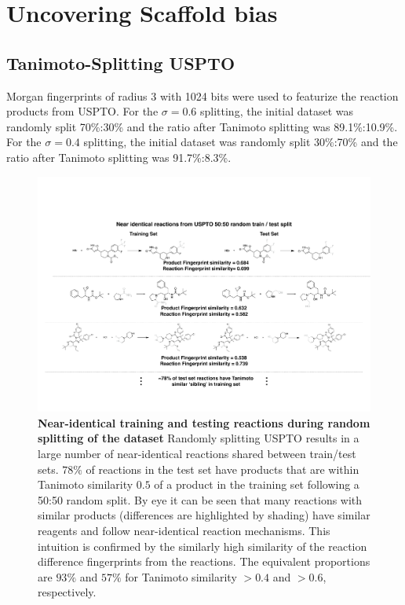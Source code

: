 \section{Uncovering Scaffold bias}

\subsection{Tanimoto-Splitting USPTO}
Morgan fingerprints of radius 3 with 1024 bits were used to featurize the reaction products from USPTO. For the $\sigma=0.6$ splitting, the initial dataset was randomly split 70\%:30\% and the ratio after Tanimoto splitting was 89.1\%:10.9\%. For the $\sigma=0.4$ splitting, the initial dataset was randomly split 30\%:70\% and the ratio after Tanimoto splitting was 91.7\%:8.3\%. 

\begin{figure}[ht!]
    \centering
    \includegraphics[width=\textwidth]{Chapters/Transformer/Figs/siblings_alt.pdf}
    \caption{\label{fig:sibling} \textbf{Near-identical training and testing reactions during random splitting of the dataset} Randomly splitting USPTO results in a large number of near-identical reactions shared between train/test sets. $78\%$ of reactions in the test set have products that are within Tanimoto similarity $0.5$ of a product in the training set following a 50:50 random split. By eye it can be seen that many reactions with similar products (differences are highlighted by shading) have similar reagents and follow near-identical reaction mechanisms. This intuition is confirmed by the similarly high similarity of the reaction difference fingerprints from the reactions. The equivalent proportions are $93\%$ and $57\%$ for Tanimoto similarity $>0.4$ and $>0.6$, respectively.}
\end{figure}


